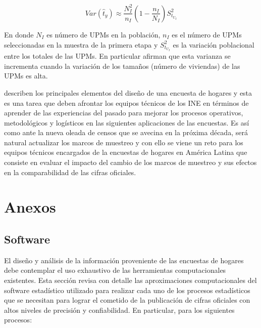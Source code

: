 \documentclass[12pt,spanish,]{book}
\begin{document}
\[Var(\hat{t}_y) \approx \frac{N_I^2}{n_I}\left(1-\frac{n_I}{N_I}\right)S^2_{t_{U_I}} \]

En donde \(N_I\) es número de UPMs en la población, \(n_I\) es el número de UPMs seleccionadas en la muestra de la primera etapa y \(S^2_{t_{U_I}}\) es la variación poblacional entre los totales de las UPMs. En particular \textcite[pág. 144]{SSW_2003} afirman que esta varianza se incrementa cuando la variación de los tamaños (número de viviendas) de las UPMs es alta.

\textcite{Beland_Dale_Dufour_Hamel_2005} describen los principales elementos del diseño de una encuesta de hogares y esta es una tarea que deben afrontar los equipos técnicos de los INE en términos de aprender de las experiencias del pasado para mejorar los procesos operativos, metodológicos y logísticos en las siguientes aplicaciones de las encuestas. Es así como ante la nueva oleada de censos que se avecina en la próxima década, será natural actualizar los marcos de muestreo y con ello se viene un reto para los equipos técnicos encargados de la encuestas de hogares en América Latina que consiste en evaluar el impacto del cambio de los marcos de muestreo y sus efectos en la comparabilidad de las cifras oficiales.

\hypertarget{anexos}{%
\chapter*{Anexos}\label{anexos}}

\hypertarget{software}{%
\section*{Software}\label{software}}

El diseño y análisis de la información proveniente de las encuestas de hogares debe contemplar el uso exhaustivo de las herramientas computacionales existentes. Esta sección revisa con detalle las aproximaciones computacionales del software estadístico utilizado para realizar cada uno de los procesos estadísticos que se necesitan para lograr el cometido de la publicación de cifras oficiales con altos niveles de precisión y confiabilidad. En particular, para los siguientes procesos:
\end{document}
